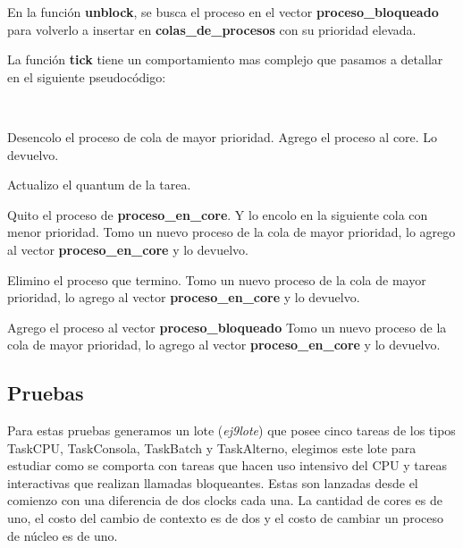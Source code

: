 En la función \textbf{unblock}, se busca el proceso en el vector \textbf{proceso\_bloqueado} para volverlo a insertar en \textbf{colas\_de\_procesos} con su prioridad elevada.

La función \textbf{tick} tiene un comportamiento mas complejo que pasamos a detallar en el siguiente pseudocódigo:

~

\begin{algorithmic}

		\State Desencolo el proceso de cola de mayor prioridad.
		\State Agrego el proceso al core.
		\State Lo devuelvo.
		
	
		\State Actualizo el quantum de la tarea.

			\State Quito el proceso de \textbf{proceso\_en\_core}. Y lo encolo en la siguiente cola con menor prioridad.
			\State Tomo un nuevo proceso de la cola de mayor prioridad, lo agrego al vector \textbf{proceso\_en\_core} y lo devuelvo.
		\EndIf

		\State Elimino el proceso que termino.
		\State Tomo un nuevo proceso de la cola de mayor prioridad, lo agrego al vector \textbf{proceso\_en\_core} y lo devuelvo.

		\State Agrego el proceso al vector \textbf{proceso\_bloqueado}
		\State Tomo un nuevo proceso de la cola de mayor prioridad, lo agrego al vector \textbf{proceso\_en\_core} y lo devuelvo.
	
	\EndIf
\EndFunction	
\end{algorithmic}

\subsection{Pruebas}

Para estas pruebas generamos un lote (\textit{ej9lote}) que posee cinco tareas de los tipos TaskCPU, TaskConsola, TaskBatch y TaskAlterno, elegimos este lote para estudiar como se comporta con tareas que hacen uso intensivo del CPU y tareas interactivas que realizan llamadas bloqueantes. Estas son lanzadas desde el comienzo con una diferencia de dos clocks cada una. La cantidad de cores es de uno, el costo del cambio de contexto es de dos y el costo de cambiar un proceso de núcleo es de uno.

